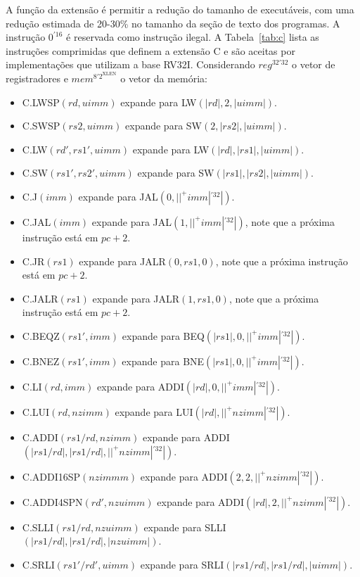   A função da extensão é permitir a redução do tamanho de executáveis, com uma redução estimada de 20-30\%
  no tamanho da seção de texto dos programas. A instrução $0^{'16}$ é reservada como instrução ilegal.
  A Tabela~\ref{tab:c} lista as instruções comprimidas que 
  definem a extensão C e são aceitas por
  implementações que utilizam a base RV32I. Considerando $reg^{32'32}$ o vetor de registradores e
  $mem^{8'2^\text{XLEN}}$ o vetor da memória:

  \begin{itemize}
  
  \item C.LWSP$(rd, uimm)$ expande para LW$(|rd|, 2, |uimm|)$.
  \item C.SWSP$(rs2, uimm)$ expande para SW$(2,|rs2|,|uimm|)$.
  \item C.LW$(rd', rs1', uimm)$ expande para LW$(|rd|, |rs1|, |uimm|)$.
  \item C.SW$(rs1', rs2', uimm)$ expande para SW$(|rs1|, |rs2|, |uimm|)$.
  \item C.J$(imm)$ expande para JAL$(0, ||^+imm|^{'32}|)$.
  \item C.JAL$(imm)$ expande para JAL$(1, ||^+imm|^{'32}|)$, note que a próxima instrução está em $pc+2$.
  \item C.JR$(rs1)$ expande para JALR$(0, rs1, 0)$, note que a próxima instrução está em $pc+2$.
  \item C.JALR$(rs1)$ expande para JALR$(1, rs1, 0)$, note que a próxima instrução está em $pc+2$.
  \item C.BEQZ$(rs1', imm)$ expande para BEQ$(|rs1|, 0, ||^+imm|^{'32}|)$.
  \item C.BNEZ$(rs1', imm)$ expande para BNE$(|rs1|, 0, ||^+imm|^{'32}|)$.
  \item C.LI$(rd, imm)$ expande para ADDI$(|rd|, 0, ||^+imm|^{'32}|)$.
  \item C.LUI$(rd, nzimm)$ expande para LUI$(|rd|, ||^+nzimm|^{'32}|)$.
  \item C.ADDI$(rs1/rd, nzimm)$ expande para ADDI$(|rs1/rd|, |rs1/rd|, ||^+nzimm|^{'32}|)$.
  \item C.ADDI16SP$(nzimmm)$ expande para ADDI$(2, 2, ||^+nzimm|^{'32}|)$.
  \item C.ADDI4SPN$(rd', nzuimm)$ expande para ADDI$(|rd|, 2, ||^+nzimm|^{'32}|)$.
  \item C.SLLI$(rs1/rd, nzuimm)$ expande para SLLI$(|rs1/rd|, |rs1/rd|, |nzuimm|)$.
  \item C.SRLI$(rs1'/rd', uimm)$ expande para SRLI$(|rs1/rd|, |rs1/rd|, |uimm|)$.

\end{itemize}
